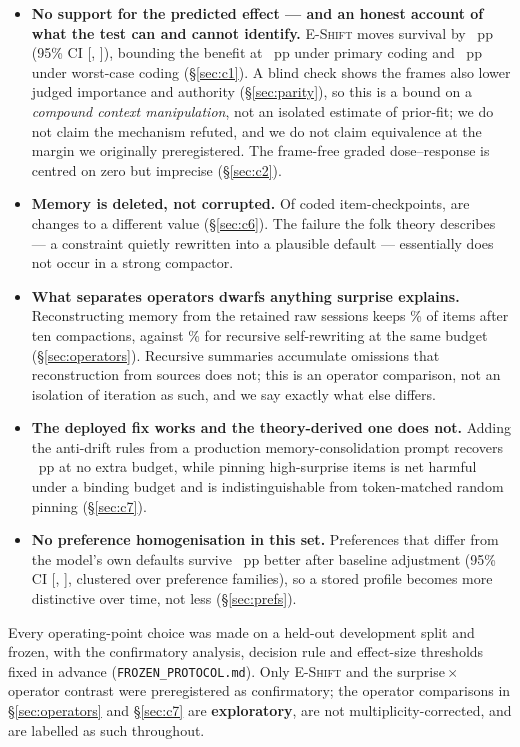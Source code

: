 \begin{itemize}\itemsep1pt
\item \textbf{No support for the predicted effect --- and an honest account of what the test can and
cannot identify.} \textsc{E-Shift} moves survival by \EShiftMean{}~pp (95\% CI [\EShiftCIlo{},
\EShiftCIhi{}]), bounding the benefit at \ConeUpper{}~pp under primary coding and \ConeUpperWorst{}~pp under
worst-case coding (\S\ref{sec:c1}). A blind check shows the frames also
lower judged importance and authority (\S\ref{sec:parity}), so this is a bound on a \emph{compound
context manipulation}, not an isolated estimate of prior-fit; we do not claim the mechanism refuted,
and we do not claim equivalence at the margin we originally preregistered. The frame-free graded
dose--response is centred on zero but imprecise (\S\ref{sec:c2}).
\item \textbf{Memory is deleted, not corrupted.} Of \NCodedCases{} coded item-checkpoints,
\ChangedCount{} are changes to a different value (\S\ref{sec:c6}). The failure the folk theory
describes --- a constraint quietly rewritten into a plausible default --- essentially does not occur
in a strong compactor.
\item \textbf{What separates operators dwarfs anything surprise explains.} Reconstructing memory
from the retained raw sessions keeps \RetOfour{}\% of items after ten compactions, against
\RetOone{}\% for recursive self-rewriting at the same budget (\S\ref{sec:operators}). Recursive
summaries accumulate omissions that reconstruction from sources does not; this is an operator
comparison, not an isolation of iteration as such, and we say exactly what else differs.
\item \textbf{The deployed fix works and the theory-derived one does not.} Adding the anti-drift
rules from a production memory-consolidation prompt recovers \ContrastOfive{}~pp at no extra budget,
while pinning high-surprise items is net harmful under a binding budget and is indistinguishable from
token-matched random pinning (\S\ref{sec:c7}).
\item \textbf{No preference homogenisation in this set.} Preferences that differ from the model's
own defaults survive \PrefAdj{}~pp better after baseline adjustment (95\% CI [\PrefAdjLo{},
\PrefAdjHi{}], clustered over \PrefNFamilies{} preference families), so a stored profile becomes
more distinctive over time, not less (\S\ref{sec:prefs}).
\end{itemize}

Every operating-point choice was made on a held-out development split and frozen, with the
confirmatory analysis, decision rule and effect-size thresholds fixed in advance
(\texttt{FROZEN\_PROTOCOL.md}). Only \textsc{E-Shift} and the surprise\,$\times$\,operator
contrast were preregistered as confirmatory; the operator comparisons in \S\ref{sec:operators} and
\S\ref{sec:c7} are \textbf{exploratory}, are not multiplicity-corrected, and are labelled as such
throughout.
